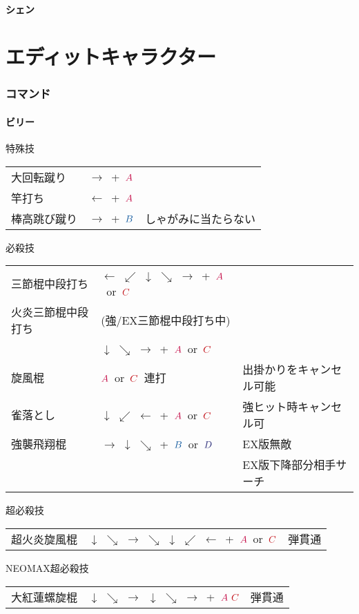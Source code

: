 \documentclass[a4j,11pt]{jarticle}
\def\A{\textcolor{Acolor}{A}}
\def\C{\textcolor{Ccolor}{C}}
\def\B{\textcolor{Bcolor}{B}}
\def\D{\textcolor{Dcolor}{D}}
\def\hado{$\downarrow$ $\searrow$ $\rightarrow$}%
\def\tatsu{$\downarrow$ $\swarrow$ $\leftarrow$}%
\def\syoryu{$\rightarrow$ $\downarrow$ $\searrow$}%
\def\yoga{$\leftarrow$ $\swarrow$ $\downarrow$ $\searrow$ $\rightarrow$}%
\def\ryuko{$\downarrow$ $\searrow$ $\rightarrow$ $\searrow$ $\downarrow$ $\swarrow$ $\leftarrow$}%
\begin{document}
\subsection{シェン}
\newpage
\part{エディットキャラクター}%
\section{コマンド}
\subsection{ビリー}
\begin{itembox}[l]{特殊技}
\begin{tabular}{lll}
大回転蹴り&$\rightarrow$\ +\ $\A$&\\%
竿打ち&$\leftarrow$\ +\ $\A$&\\%
棒高跳び蹴り&$\rightarrow$\ +\ $\B$&しゃがみに当たらない%
\end{tabular}
\end{itembox}
\begin{itembox}[l]{必殺技}
\begin{tabular}{lll}
三節棍中段打ち&\yoga\ +\ $\A$\ or\ $\C$&\\%
火炎三節棍中段打ち&(強/EX三節棍中段打ち中)&\\
&\hado\ +\ $\A$\ or\ $\C$&\\
旋風棍&$\A$\ or\ $\C$\ 連打&出掛かりをキャンセル可能\\%
雀落とし&\tatsu\ +\ $\A$\ or\ $\C$&強ヒット時キャンセル可\\%
強襲飛翔棍&\syoryu\ +\ $\B$\ or\ $\D$&EX版無敵\\&&EX版下降部分相手サーチ%
\end{tabular}
\end{itembox}
\begin{itembox}[l]{超必殺技}
\begin{tabular}{lll}
超火炎旋風棍&\ryuko\ +\ $\A$\ or\ $\C$&弾貫通%
\end{tabular}
\end{itembox}
\begin{itembox}[l]{NEOMAX超必殺技}
\begin{tabular}{lll}
大紅蓮螺旋棍&\hado\ \hado\ +\ $\A\ \C$&弾貫通%
\end{tabular}
\end{itembox}
\newpage
\end{document}
